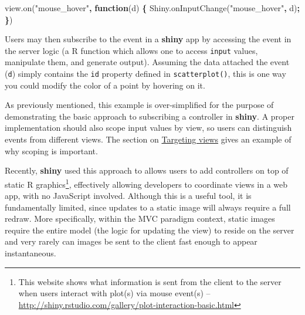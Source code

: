 \documentclass[12pt,]{isuthesis}
\newenvironment{Shaded}{\begin{snugshade}}{\end{snugshade}}
\newcommand{\KeywordTok}[1]{\textcolor[rgb]{0.13,0.29,0.53}{\textbf{{#1}}}}
\newcommand{\DataTypeTok}[1]{\textcolor[rgb]{0.13,0.29,0.53}{{#1}}}
\newcommand{\DecValTok}[1]{\textcolor[rgb]{0.00,0.00,0.81}{{#1}}}
\newcommand{\StringTok}[1]{\textcolor[rgb]{0.31,0.60,0.02}{{#1}}}
\newcommand{\VariableTok}[1]{\textcolor[rgb]{0.00,0.00,0.00}{{#1}}}
\newcommand{\OperatorTok}[1]{\textcolor[rgb]{0.81,0.36,0.00}{\textbf{{#1}}}}
\newcommand{\AttributeTok}[1]{\textcolor[rgb]{0.77,0.63,0.00}{{#1}}}
\newcommand{\NormalTok}[1]{{#1}}
\let\rmarkdownfootnote\footnote%
\def\footnote{\protect\rmarkdownfootnote}
\begin{document}
\begin{Shaded}
\begin{Highlighting}[]
\VariableTok{view}\NormalTok{.}\AttributeTok{on}\NormalTok{(}\StringTok{"mouse_hover"}\OperatorTok{,} \KeywordTok{function}\NormalTok{(d) }\OperatorTok{\{}
  \VariableTok{Shiny}\NormalTok{.}\AttributeTok{onInputChange}\NormalTok{(}\StringTok{"mouse_hover"}\OperatorTok{,} \NormalTok{d)}\OperatorTok{;}
\OperatorTok{\}}\NormalTok{)}
\end{Highlighting}
\end{Shaded}

Users may then subscribe to the event in a \textbf{shiny} app by
accessing the event in the server logic (a R function which allows one
to access \texttt{input} values, manipulate them, and generate output).
Assuming the data attached the event (\texttt{d}) simply contains the
\texttt{id} property defined in \texttt{scatterplot()}, this is one way
you could modify the color of a point by hovering on it.

\begin{Shaded}
\end{Shaded}

As previously mentioned, this example is over-simplified for the purpose
of demonstrating the basic approach to subscribing a controller in
\textbf{shiny}. A proper implementation should also scope input values
by view, so users can distinguish events from different views. The
section on \protect\hyperlink{targeting-views}{Targeting views} gives an
example of why scoping is important.

Recently, \textbf{shiny} used this approach to allows users to add
controllers on top of static R graphics\footnote{This website shows what
  information is sent from the client to the server when users interact
  with plot(s) via mouse event(s) --
  \url{http://shiny.rstudio.com/gallery/plot-interaction-basic.html}},
effectively allowing developers to coordinate views in a web app, with
no JavaScript involved. Although this is a useful tool, it is
fundamentally limited, since updates to a static image will always
require a full redraw. More specifically, within the MVC paradigm
context, static images require the entire model (the logic for updating
the view) to reside on the server and very rarely can images be sent to
the client fast enough to appear instantaneous.
\end{document}

